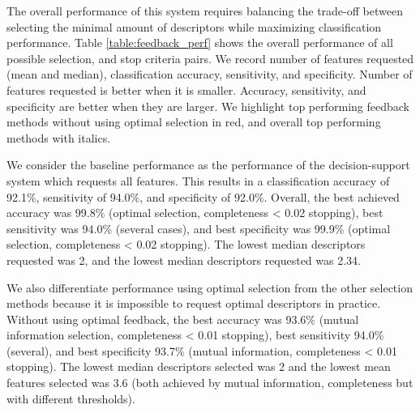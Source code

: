 The overall performance of this system requires balancing the trade-off between selecting the minimal amount of descriptors while maximizing classification performance. Table \ref{table:feedback_perf} shows the overall performance of all possible selection, and stop criteria pairs. We record number of features requested (mean and median), classification accuracy, sensitivity, and specificity. Number of features requested is better when it is smaller. Accuracy, sensitivity, and specificity are better when they are larger. We highlight top performing feedback methods without using optimal selection in red, and overall top performing methods with italics.

We consider the baseline performance as the performance of the decision-support system which requests all features. This results in a classification accuracy of 92.1\%, sensitivity of 94.0\%, and specificity of 92.0\%. Overall, the best achieved accuracy was 99.8\% (optimal selection, completeness < 0.02 stopping), best sensitivity was 94.0\% (several cases), and best specificity was 99.9\% (optimal selection, completeness < 0.02 stopping). The lowest median descriptors requested was 2, and the lowest median descriptors requested was 2.34.

We also differentiate performance using optimal selection from the other selection methods because it is impossible to request optimal descriptors in practice. Without using optimal feedback, the best accuracy was 93.6\% (mutual information selection, completeness < 0.01 stopping), best sensitivity 94.0\% (several), and best specificity 93.7\% (mutual information, completeness < 0.01 stopping). The lowest median descriptors selected was 2 and the lowest mean features selected was 3.6 (both achieved by mutual information, completeness but with different thresholds).







